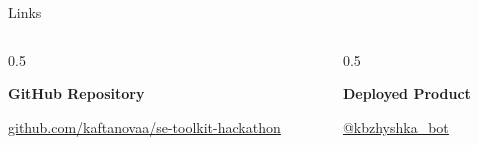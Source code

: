 \documentclass[aspectratio=169]{beamer}
\begin{document}
\begin{frame}{Links}
    \vspace{0.3cm}
    
    \begin{columns}[T]
        \begin{column}{0.5\textwidth}
            \begin{center}
                \faGithub{} \textbf{GitHub Repository}
                \vspace{0.3cm}
                
                \href{https://github.com/kaftanovaa/se-toolkit-hackathon}{
                    \color{blue}\underline{github.com/kaftanovaa/se-toolkit-hackathon}
                }
                
                \vspace{0.3cm}
                
            \end{center}
        \end{column}

        \begin{column}{0.5\textwidth}
            \begin{center}
                \faRocket{} \textbf{Deployed Product}
                \vspace{0.3cm}
                
                \href{https://t.me/kbzhyshka_bot}{
                    \color{blue}\underline{@kbzhyshka\_bot}
                }
                
                \vspace{0.3cm}
                
            \end{center}
        \end{column}
    \end{columns}
\end{frame}
\end{document}
